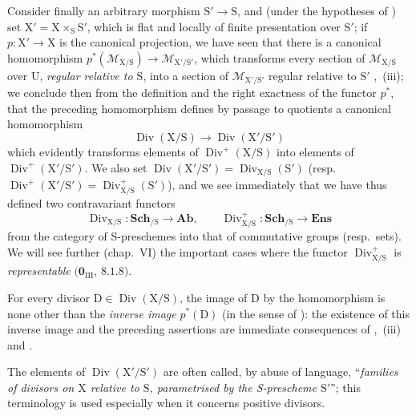 \begin{env}[21.15.9]
\label{IV.21.15.9}
Consider finally an arbitrary morphism $\mathrm{S}'\to\mathrm{S}$, and (under the hypotheses of ) set $\mathrm{X}'=\mathrm{X}\times_{\mathrm{S}}\mathrm{S}'$, which is flat and locally of finite presentation over $\mathrm{S}'$; if $p:\mathrm{X}'\to\mathrm{X}$ is the canonical projection, we have seen  that there is a canonical homomorphism $p^*(\mathscr{M}_{\mathrm{X}/\mathrm{S}})\to\mathscr{M}_{\mathrm{X}'/\mathrm{S}'}$, which transforms every section of $\mathscr{M}_{\mathrm{X}/\mathrm{S}}$ over $\mathrm{U}$, \emph{regular relative to $\mathrm{S}$}, into a section of $\mathscr{M}_{\mathrm{X}'/\mathrm{S}'}$ regular relative to $\mathrm{S}'$ ,~(iii); we conclude then from the definition  and the right exactness of the functor $p^*$, that the preceding homomorphism defines by passage to quotients a canonical homomorphism
\[
\label{IV.21.15.9.1}
  \operatorname{Div}(\mathrm{X}/\mathrm{S})\to\operatorname{Div}(\mathrm{X}'/\mathrm{S}')
  \tag{21.15.9.1}
\]
which evidently transforms elements of $\operatorname{Div}^+(\mathrm{X}/\mathrm{S})$ into elements of $\operatorname{Div}^+(\mathrm{X}'/\mathrm{S}')$.
We also set $\operatorname{Div}(\mathrm{X}'/\mathrm{S}')=\operatorname{Div}_{\mathrm{X}/\mathrm{S}}(\mathrm{S}')$ (resp.\ $\operatorname{Div}^+(\mathrm{X}'/\mathrm{S}')=\operatorname{Div}_{\mathrm{X}/\mathrm{S}}^+(\mathrm{S}')$), and we see immediately that we have thus defined two contravariant functors
\[
  \operatorname{Div}_{\mathrm{X}/\mathrm{S}}:\mathbf{Sch}_{/\mathrm{S}}\to\mathbf{Ab},\qquad\operatorname{Div}_{\mathrm{X}/\mathrm{S}}^+:\mathbf{Sch}_{/\mathrm{S}}\to\mathbf{Ens}
\]
from the category of S-preschemes into that of commutative groups (resp.\ sets).
We will see further (chap.~VI) the important cases where the functor $\operatorname{Div}_{\mathrm{X}/\mathrm{S}}^+$ is \emph{representable} $(\mathbf{0}_{\mathrm{III}}$, $8.1.8)$.

For every divisor $\mathrm{D}\in\operatorname{Div}(\mathrm{X}/\mathrm{S})$, the image of $\mathrm{D}$ by the homomorphism  is none other than the \emph{inverse image} $p^*(\mathrm{D})$ (in the sense of ): the existence of this inverse image and the preceding assertions are immediate consequences of ,~(iii) and .

The elements of $\operatorname{Div}(\mathrm{X}'/\mathrm{S}')$ are often called, by abuse of language, ``\emph{families of divisors on $\mathrm{X}$ relative to $\mathrm{S}$, parametrised by the S-prescheme $\mathrm{S}'$}''; this terminology is used especially when it concerns positive divisors.
\end{env}
